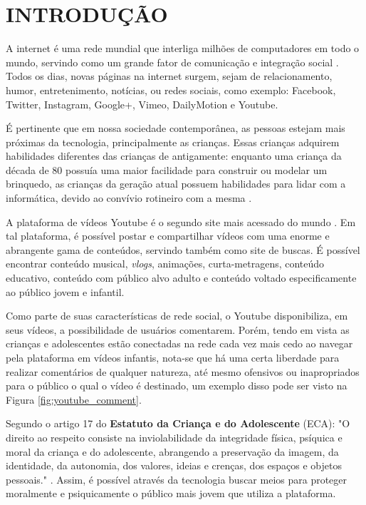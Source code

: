 \section{INTRODUÇÃO}


A internet é uma rede mundial que interliga milhões de computadores em todo o mundo, servindo como um grande fator de comunicação e integração social \cite{marioFalcao2015}. Todos os dias, novas páginas na internet surgem, sejam de relacionamento, humor, entretenimento, notícias, ou redes sociais, como exemplo: Facebook, Twitter, Instagram, Google+, Vimeo, DailyMotion e Youtube.

É pertinente que em nossa sociedade contemporânea, as pessoas estejam mais próximas da tecnologia, principalmente as crianças. 
Essas crianças adquirem habilidades diferentes das crianças de antigamente: enquanto uma criança da década de 80 possuía uma maior facilidade para construir ou modelar um brinquedo, as crianças da geração atual possuem habilidades para lidar com a informática, devido ao convívio rotineiro com a mesma \cite{marioFalcao2016}.

A plataforma de vídeos Youtube é o segundo site mais acessado do mundo \cite{alexaYoutube}. Em tal plataforma, é possível postar e compartilhar vídeos com uma enorme e abrangente gama de conteúdos, servindo também como site de buscas. É possível encontrar conteúdo musical, \textit{vlogs}, animações, curta-metragens, conteúdo educativo, conteúdo com público alvo adulto e conteúdo voltado especificamente ao público jovem e infantil. 

Como parte de suas características de rede social, o Youtube disponibiliza, em seus vídeos, a possibilidade de usuários comentarem. Porém, tendo em vista as crianças e adolescentes estão conectadas na rede cada vez mais cedo \cite{EnyoGoncalves2017} ao navegar pela plataforma em vídeos infantis, nota-se que há uma certa liberdade para realizar comentários de qualquer natureza, até mesmo ofensivos ou inapropriados para o público o qual o vídeo é destinado, um exemplo disso pode ser visto na Figura \ref{fig:youtube_comment}.

Segundo o artigo 17 do \textbf{Estatuto da Criança e do Adolescente} (ECA): "O direito ao respeito consiste na inviolabilidade da integridade física, psíquica e moral da criança e do adolescente, abrangendo a preservação da imagem, da identidade, da autonomia, dos valores, ideias e crenças, dos espaços e objetos pessoais." \cite{eca_lei}.  Assim, é possível através da tecnologia buscar meios para proteger moralmente e psiquicamente o público mais jovem que utiliza a plataforma. %

